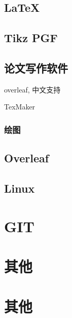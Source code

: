 \subsection{LaTeX}

\subsection{Tikz  PGF}



\subsection{论文写作软件}

overleaf,
中文支持

TexMaker


\subsubsection{绘图}



\subsection{Overleaf}



\subsection{Linux }

\section{GIT}

\section{其他 }
\section{其他 }